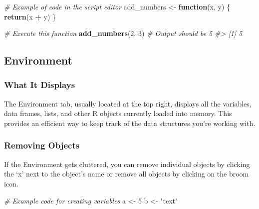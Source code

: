 \documentclass[
]{book}
\newenvironment{Shaded}{\begin{snugshade}}{\end{snugshade}}
\newcommand{\CommentTok}[1]{\textcolor[rgb]{0.56,0.35,0.01}{\textit{#1}}}
\newcommand{\ControlFlowTok}[1]{\textcolor[rgb]{0.13,0.29,0.53}{\textbf{#1}}}
\newcommand{\DecValTok}[1]{\textcolor[rgb]{0.00,0.00,0.81}{#1}}
\newcommand{\FunctionTok}[1]{\textcolor[rgb]{0.13,0.29,0.53}{\textbf{#1}}}
\newcommand{\NormalTok}[1]{#1}
\newcommand{\OtherTok}[1]{\textcolor[rgb]{0.56,0.35,0.01}{#1}}
\newcommand{\SpecialCharTok}[1]{\textcolor[rgb]{0.81,0.36,0.00}{\textbf{#1}}}
\newcommand{\StringTok}[1]{\textcolor[rgb]{0.31,0.60,0.02}{#1}}
\begin{document}
\begin{Shaded}
\begin{Highlighting}[]
\CommentTok{\# Example of code in the script editor}
\NormalTok{add\_numbers }\OtherTok{\textless{}{-}} \ControlFlowTok{function}\NormalTok{(x, y) \{}
  \FunctionTok{return}\NormalTok{(x }\SpecialCharTok{+}\NormalTok{ y)}
\NormalTok{\}}

\CommentTok{\# Execute this function}
\FunctionTok{add\_numbers}\NormalTok{(}\DecValTok{2}\NormalTok{, }\DecValTok{3}\NormalTok{)  }\CommentTok{\# Output should be 5}
\CommentTok{\#\textgreater{} [1] 5}
\end{Highlighting}
\end{Shaded}

\hypertarget{environment}{%
\subsection*{Environment}\label{environment}}

\hypertarget{what-it-displays}{%
\subsubsection*{What It Displays}\label{what-it-displays}}

The Environment tab, usually located at the top right, displays all the variables, data frames, lists, and other R objects currently loaded into memory. This provides an efficient way to keep track of the data structures you're working with.

\hypertarget{removing-objects}{%
\subsubsection*{Removing Objects}\label{removing-objects}}

If the Environment gets cluttered, you can remove individual objects by clicking the `x' next to the object's name or remove all objects by clicking on the broom icon.

\begin{Shaded}
\begin{Highlighting}[]
\CommentTok{\# Example code for creating variables}
\NormalTok{a }\OtherTok{\textless{}{-}} \DecValTok{5}
\NormalTok{b }\OtherTok{\textless{}{-}} \StringTok{"text"}
\end{Highlighting}
\end{Shaded}
\end{document}
